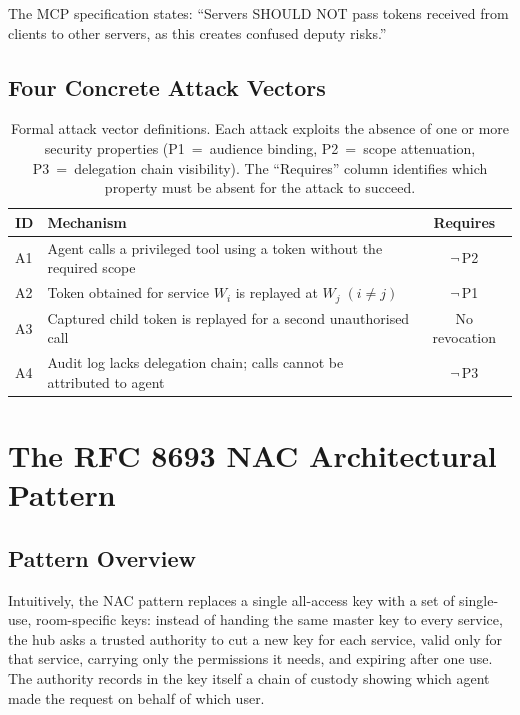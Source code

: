 \documentclass[journal]{IEEEtran}
\begin{document}
The MCP specification \cite{mcp_security} states: ``Servers SHOULD NOT pass
tokens received from clients to other servers, as this creates confused deputy
risks.''

\subsection{Four Concrete Attack Vectors}

\begin{table}[h]
\caption{Formal attack vector definitions. Each attack exploits the absence of
one or more security properties (P1~=~audience binding, P2~=~scope attenuation,
P3~=~delegation chain visibility). The ``Requires'' column identifies which
property must be absent for the attack to succeed.}
\label{tab:attack_formal}
\centering
\footnotesize
\setlength{\tabcolsep}{3pt}
\begin{tabularx}{\columnwidth}{l X c}
\toprule
\textbf{ID} & \textbf{Mechanism} & \textbf{Requires} \\
\midrule
A1 & Agent calls a privileged tool using a token without the required scope
     & $\neg$\,P2 \\
A2 & Token obtained for service $W_i$ is replayed at $W_j\;(i\neq j)$
     & $\neg$\,P1 \\
A3 & Captured child token is replayed for a second unauthorised call
     & No revocation \\
A4 & Audit log lacks delegation chain; calls cannot be attributed to agent
     & $\neg$\,P3 \\
\bottomrule
\end{tabularx}
\end{table}


\section{The RFC 8693 NAC Architectural Pattern}
\label{sec:solution}

\subsection{Pattern Overview}

Intuitively, the NAC pattern replaces a single all-access key with a set of
single-use, room-specific keys: instead of handing the same master key to every
service, the hub asks a trusted authority to cut a new key for each service,
valid only for that service, carrying only the permissions it needs, and expiring
after one use. The authority records in the key itself a chain of custody showing
which agent made the request on behalf of which user.
\end{document}

